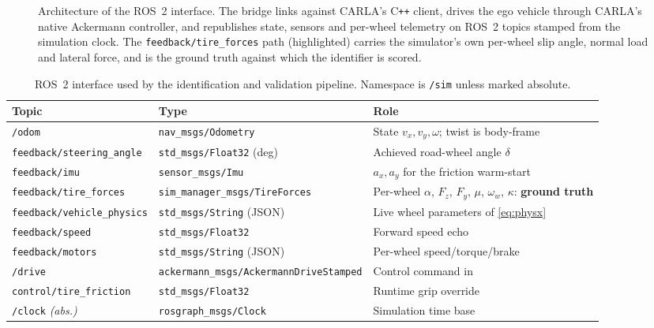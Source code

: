 \begin{figure}[t]
\centering
\resizebox{\textwidth}{!}{}
\caption{Architecture of the \bridge{} ROS~2 interface. The bridge links
against CARLA's C\texttt{++} client, drives the ego vehicle through CARLA's
native Ackermann controller, and republishes state, sensors and per-wheel
telemetry on ROS~2 topics stamped from the simulation clock. The
\texttt{feedback/\allowbreak tire\_forces} path (highlighted) carries the
simulator's own per-wheel slip angle, normal load and lateral force, and is the
ground truth against which the identifier is scored.}
\label{fig:bridge}
\end{figure}

\begin{table}[t]
\caption{ROS~2 interface used by the identification and validation pipeline.
Namespace is \texttt{/sim} unless marked absolute.}
\label{tab:topics}
\centering
\scriptsize
\setlength{\tabcolsep}{3pt}
\begin{tabular}{@{}p{2.4cm}p{2.75cm}p{2.5cm}@{}}
\toprule
Topic & Type & Role\\
\midrule
\texttt{/odom} & \texttt{nav\_msgs/Odometry} & State $v_{x},v_{y},\omega$; twist is body-frame\\
\texttt{feedback/\allowbreak steering\_angle} & \texttt{std\_msgs/Float32} (deg) & Achieved road-wheel angle $\delta$\\
\texttt{feedback/imu} & \texttt{sensor\_msgs/Imu} & $a_{x},a_{y}$ for the friction warm-start\\
\texttt{feedback/\allowbreak tire\_forces} & \texttt{sim\_manager\_\allowbreak msgs/\allowbreak TireForces} & Per-wheel $\alpha$, $F_{z}$, $F_{y}$, $\mu$, $\omega_{w}$, $\kappa$: \textbf{ground truth}\\
\texttt{feedback/\allowbreak vehicle\_physics} & \texttt{std\_msgs/String} (JSON) & Live wheel parameters of \eqref{eq:physx}\\
\texttt{feedback/speed} & \texttt{std\_msgs/Float32} & Forward speed echo\\
\texttt{feedback/motors} & \texttt{std\_msgs/String} (JSON) & Per-wheel speed/torque/brake\\
\texttt{/drive} & \texttt{ackermann\_msgs/\allowbreak Ackermann\allowbreak Drive\allowbreak Stamped} & Control command in\\
\texttt{control/\allowbreak tire\_friction} & \texttt{std\_msgs/Float32} & Runtime grip override\\
\texttt{/clock} \emph{(abs.)} & \texttt{rosgraph\_msgs/\allowbreak Clock} & Simulation time base\\
\bottomrule
\end{tabular}
\end{table}


